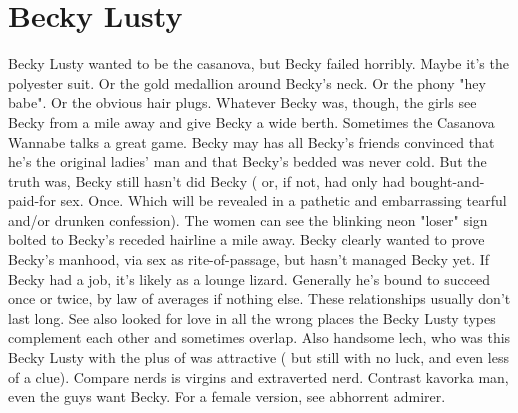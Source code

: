 \documentclass[12pt]{book}
\begin{document}
\chapter{Becky Lusty}

Becky Lusty wanted to be the casanova, but Becky failed horribly. Maybe it's the polyester suit. Or the gold medallion around Becky's neck. Or the phony "hey babe". Or the obvious hair plugs. Whatever Becky was, though, the girls see Becky from a mile away and give Becky a wide berth. Sometimes the Casanova Wannabe talks a great game. Becky may has all Becky's friends convinced that he's the original ladies' man and that Becky's bedded was never cold. But the truth was, Becky still hasn't did Becky ( or, if not, had only had bought-and-paid-for sex. Once. Which will be revealed in a pathetic and embarrassing tearful and/or drunken confession). The women can see the blinking neon "loser" sign bolted to Becky's receded hairline a mile away. Becky clearly wanted to prove Becky's manhood, via sex as rite-of-passage, but hasn't managed Becky yet. If Becky had a job, it's likely as a lounge lizard. Generally he's bound to succeed once or twice, by law of averages if nothing else. These relationships usually don't last long. See also looked for love in all the wrong places  the Becky Lusty types complement each other and sometimes overlap. Also handsome lech, who was this Becky Lusty with the plus of was attractive ( but still with no luck, and even less of a clue). Compare nerds is virgins and extraverted nerd. Contrast kavorka man, even the guys want Becky. For a female version, see abhorrent admirer.
\end{document}
